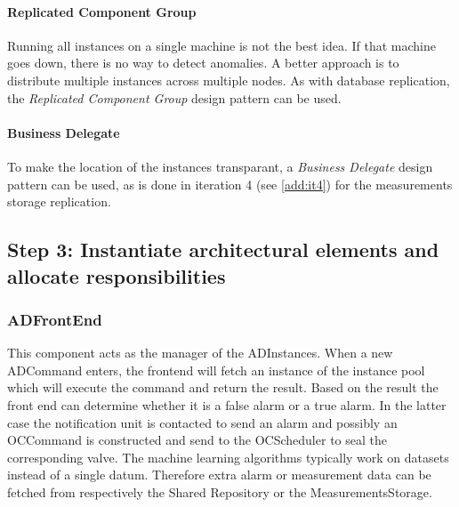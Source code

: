 \paragraph{Replicated Component Group}

\npar Running all instances on a single machine is not the best idea. If that
machine goes down, there is no way to detect anomalies. A better approach is to
distribute multiple instances across multiple nodes. As with database
replication, the  \emph{Replicated Component Group} design pattern
\citep[see][p.~326]{Buschmann:07} can be used.

\paragraph{Business Delegate}

\npar To make the location of the instances transparant, a \emph{Business
Delegate} design pattern \citep[see][p.~292]{Buschmann:07} can be used, as is
done in iteration 4 (see \ref{add:it4}) for the measurements storage replication.

\subsection{Step 3: Instantiate architectural elements and allocate responsibilities}
\label{add:it6/elements}


\subsubsection{ADFrontEnd}

\npar This component acts as the manager of the ADInstances. When a new
ADCommand enters, the frontend will fetch an instance of the instance pool
which will execute the command and return the result. Based on the result the front
end can determine whether it is a false alarm or a true alarm. In the latter
case the notification unit is contacted to send an alarm and possibly an
OCCommand is constructed and send to the OCScheduler to seal the corresponding
valve. The machine learning algorithms typically work on datasets instead of a
single datum. Therefore extra alarm or measurement data can be fetched from
respectively the Shared Repository or the MeasurementsStorage.

